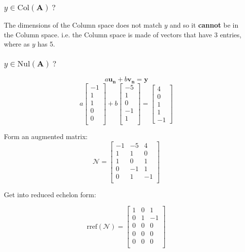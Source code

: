 \documentclass{article}
\begin{document}
\vspace{2mm}

\subsubsection{$ y \in \text{Col}(\mathbf{A}) \ ?$}
The dimensions of the Column space does not match $y$ and so it \textbf{cannot} be in the
Column space. i.e. the Column space is made of vectors that have 3 entries, where as
$y$ has 5.

\subsubsection{$ y \in \text{Nul}(\mathbf{A}) \ ?$}


\[%
    a \mathbf{u_n} + b \mathbf{v_n} = \mathbf{y}
\]%
\[%
    a
    \begin{bmatrix} 
        -1 \\
		1 \\
		1 \\
		0 \\
		0 \\		
    \end{bmatrix}
    +
    b
    \begin{bmatrix} 
        -5 \\
		1 \\
		0 \\
		-1 \\
		1 \\		
    \end{bmatrix}
    =
    \begin{bmatrix} 4\\0\\1\\1\\-1 \end{bmatrix}
\]%

Form an augmented matrix:
\[%
    \mathcal{N} = 
    \begin{bmatrix} 
        -1 & -5 & 4 \\
		1 & 1 & 0 \\
		1 & 0 & 1 \\
		0 & -1 & 1 \\
		0 & 1 & -1 \\		
    \end{bmatrix}
\]%

Get into reduced echelon form:

\[%
    \text{rref} (\mathcal{N}) 
    =
    \begin{bmatrix} 
        1 & 0 & 1 \\
		0 & 1 & -1 \\
		0 & 0 & 0 \\
		0 & 0 & 0 \\
		0 & 0 & 0 \\		
    \end{bmatrix}
\]%
\end{document}
